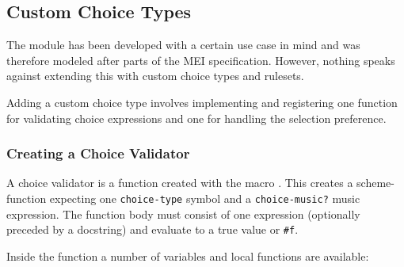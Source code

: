 \documentclass[]{ollmanual}
\newenvironment{Shaded}{}{}
\begin{document}
\begin{Shaded}
\begin{Highlighting}[]

\end{Highlighting}
\end{Shaded}


\hypertarget{custom-choice-types}{%
\subsection{Custom Choice Types}\label{custom-choice-types}}

The  module has been developed with a
certain use case in mind and was therefore modeled after parts of the
MEI specification. However, nothing speaks against extending this with
custom choice types and rulesets.

Adding a custom choice type involves implementing and registering one
function for validating choice expressions and one for handling the
selection preference.

\hypertarget{creating-a-choice-validator}{%
\subsubsection{Creating a Choice
Validator}\label{creating-a-choice-validator}}

A choice validator is a function created with the macro
. This creates a scheme-function
expecting one \texttt{choice-type} symbol and a \texttt{choice-music?}
music expression. The function body must consist of one expression
(optionally preceded by a docstring) and evaluate to a true value or
\texttt{\#f}.

Inside the function a number of variables and local functions are
available:
\end{document}

